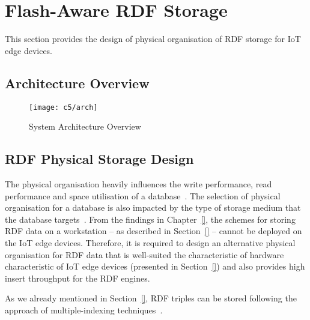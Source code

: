 





\chapter{Flash-Aware RDF Storage}
\label{ch:rdfstorage}


This section provides the design of physical organisation of RDF storage for IoT edge devices.

\section{Architecture Overview}
\label{s:ao}


\begin{figure}[ht!]
   \centering
   \texttt{[image: c5/arch]}
     \caption{System Architecture Overview}
   \label{fig:arc_ove} 
\end{figure}




\section{RDF Physical Storage Design}
\label{sec:c4-retionale}

The physical organisation heavily influences the write performance, read performance and space utilisation of a database~\citep{Ullman:2001}. 
The selection of physical organisation for a database is also impacted by the type of storage medium that the database targets~\citep{Owens:2011}.
From the findings in Chapter~\ref{}, the schemes for storing RDF data on a workstation -- as described in Section~\ref{} -- cannot be deployed on the IoT edge devices.
Therefore, it is required to design an alternative physical organisation for RDF data that is well-suited the characteristic of hardware characteristic of IoT edge devices (presented in Section~\ref{}) and also provides high insert throughput for the RDF engines.

As we already mentioned in Section~\ref{}, RDF triples can be stored following the approach of multiple-indexing techniques~\citep{}.



